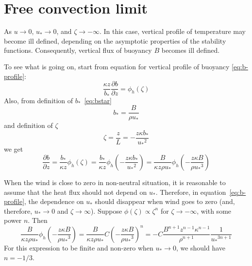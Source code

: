 \documentclass{article}
\newcommand{\pderiv}[2]{\frac{\partial #1}{\partial #2}} %
\newcommand{\vonkarman}{\kappa} %
\newcommand{\ustar}{\ensuremath{u_*}} %
\newcommand{\bstar}{\ensuremath{b_*}} %
\newcommand{\fstab}{\phi} %
\begin{document}
\section{Free convection limit}

As $u \to 0$, $\ustar \to 0$, and $\zeta \to -\infty$. In this case, vertical profile of temperature may become ill defined, depending on the asymptotic properties of the stability functions. Consequently, vertical flux of buoyancy $B$ becomes ill defined.

To see what is going on, start from equation for vertical profile of buoyancy \eqref{eq:b-profile}:
\begin{equation*}
    \frac{\vonkarman z}{\bstar}\pderiv{b}{z} = \fstab_h(\zeta)
\end{equation*}
Also, from definition of \bstar~\eqref{eq:bstar}
\begin{equation*}
    \bstar = \frac{B}{\rho \ustar}
\end{equation*}
and definition of $\zeta$
\begin{equation*}
    \zeta = \frac{z}{L} = -\frac{z \vonkarman \bstar}{\ustar^2}
\end{equation*}
we get
\begin{equation}
    \pderiv{b}{z} = \frac{\bstar}{\vonkarman z}\fstab_h(\zeta)
    = \frac{\bstar}{\vonkarman z}\fstab_h\left(-\frac{z \vonkarman \bstar}{\ustar^2}\right)
    = \frac{B}{\vonkarman z \rho \ustar }\fstab_h
      \left(-\frac{z \vonkarman B}{\rho \ustar^3}\right)
\end{equation}

When the wind is close to zero in non-neutral situation, it is reasonable to assume that the heat flux should not depend on $\ustar$. Therefore, in equation~\eqref{eq:b-profile}, the dependence on $\ustar$ should disappear when wind goes to zero (and, therefore, $\ustar \to 0$ and $\zeta \to \infty$). Suppose $\fstab(\zeta) \propto \zeta^n$ for $\zeta \to -\infty$, with some power $n$. Then
\begin{equation}
    \frac{B}{\vonkarman z \rho \ustar }\fstab_h \left(-\frac{z \vonkarman B}{\rho \ustar^3}\right)
  = \frac{B}{\vonkarman z \rho \ustar } C \left(-\frac{z \vonkarman B}{\rho \ustar^3}\right)^n
  = - C \frac{B^{n+1} z^{n-1} \vonkarman^{n-1}}{\rho^{n+1}} \frac{1}{\ustar^{3n+1}}
\end{equation}
For this expression to be finite and non-zero when $\ustar \to 0$, we should have $n=-1/3$.
\end{document}
